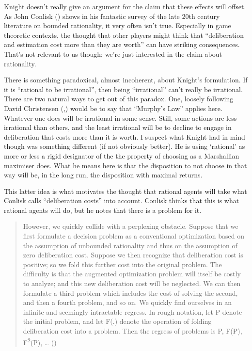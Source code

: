 \documentclass[
  10pt,
  letterpaper,
  twoside]{scrbook}
\begin{document}
Knight doesn't really give an argument for the claim that these effects
will offset. As John Conlisk () shows in
his fantastic survey of the late 20th century literature on bounded
rationality, it very often isn't true. Especially in game theoretic
contexts, the thought that other players might think that ``deliberation
and estimation cost more than they are worth'' can have striking
consequences. That's not relevant to us though; we're just interested in
the claim about rationality.

There is something paradoxical, almost incoherent, about Knight's
formulation. If it is ``rational to be irrational'', then being
``irrational'' can't really be irrational. There are two natural ways to
get out of this paradox. One, loosely following David Christensen
(,) would be to say that ``Murphy's
Law'' applies here. Whatever one does will be irrational in some sense.
Still, some actions are less irrational than others, and the least
irrational will be to decline to engage in deliberation that costs more
than it is worth. I suspect what Knight had in mind though was something
different (if not obviously better). He is using `rational' as more or
less a rigid designator of the the property of choosing as a Marshallian
maximiser does. What he means here is that the disposition to not choose
in that way will be, in the long run, the disposition with maximal
returns.

This latter idea is what motivates the thought that rational agents will
take what Conlisk calls ``deliberation costs'' into account. Conlisk
thinks that this is what rational agents will do, but he notes that
there is a problem for it.

\begin{quote}
However, we quickly collide with a perplexing obstacle. Suppose that we
first formulate a decision problem as a conventional optimization based
on the assumption of unbounded rationality and thus on the assumption of
zero deliberation cost. Suppose we then recognize that deliberation cost
is positive; so we fold this further cost into the original problem. The
difficulty is that the augmented optimization problem will itself be
costly to analyze; and this new deliberation cost will be neglected. We
can then formulate a third problem which includes the cost of solving
the second, and then a fourth problem, and so on. We quickly find
ourselves in an infinite and seemingly intractable regress. In rough
notation, let P denote the initial problem, and let F(.) denote the
operation of folding deliberation cost into a problem. Then the regress
of problems is P, F(P), F\textsuperscript{2}(P), \ldots{}
()
\end{quote}
\end{document}

